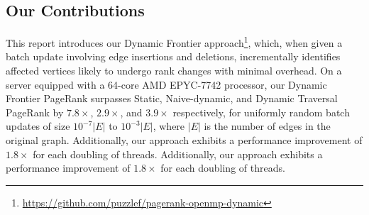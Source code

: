 \subsection{Our Contributions}

This report introduces our Dynamic Frontier approach\footnote{\url{https://github.com/puzzlef/pagerank-openmp-dynamic}}, which, when given a batch update involving edge insertions and deletions, incrementally identifies affected vertices likely to undergo rank changes with minimal overhead. On a server equipped with a 64-core AMD EPYC-7742 processor, our Dynamic Frontier PageRank surpasses Static, Naive-dynamic, and Dynamic Traversal PageRank by $7.8\times$, $2.9\times$, and $3.9\times$ respectively, for uniformly random batch updates of size $10^{-7}|E|$ to $10^{-3}|E|$, where $|E|$ is the number of edges in the original graph. Additionally, our approach exhibits a performance improvement of $1.8\times$ for each doubling of threads. Additionally, our approach exhibits a performance improvement of $1.8\times$ for each doubling of threads.








